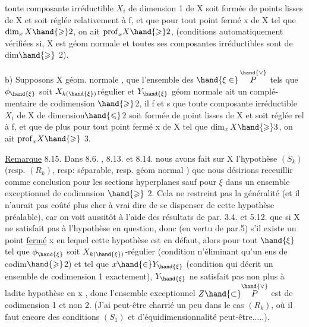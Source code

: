 

toute composante irréductible $X_i$ de dimension 1  de X soit 
formée de points lisses de X et soit  réglée relativement à f, et que
pour tout point fermé  x de X tel que $\dim_x X \hand{\geqslant} 2$, on ait $\mathrm{prof}_x X \hand{\geqslant} 2$,
(conditions automatiquement vérifiées si, X est géom normale et toutes ses
composantes irréductibles sont de dim$\hand{\geqslant}$ 2).

b) Supposons X géom. normale ,  que l'ensemble  des $\hand{\xi \in}\, \overset{\hand{\vee}}{P}$
tels que $\phi_{\hand{\xi}}$ soit $X_{k(\hand{\xi})}$\hand{-}régulier et $Y_{\hand{\xi}}$  géom normale ait un complé-%
mentaire de codimension $\hand{\geqslant}$2, il f et s que  toute composante
irréductible $X_i$ de X de dimension$\hand{\leqslant}$2 soit formée de point lisses de
X et soit réglée rel à f, et que de plus pour tout point fermé x de X
tel que $\dim_x X \hand{\geqslant} 3$, on ait $\mathrm{prof}_x X \hand{\geqslant}$ 3.





\uline{Remarque} 8.15. Dans 8.6. , 8.13. et 8.14. nous avons fait sur X
l'hypothèse $(S_k)$ (resp. $(R_k)$, resp: séparable, resp. géom normal ) que
nous désirions receuillir comme conclusion pour les sections hyperplanes
sauf pour $\xi$ dans un ensemble exceptionnel de codimnsion $\hand{\geqslant}$ 2. Cela ne restreint
pas la généralité (et il n'aurait pas coûté plus cher à vrai dire
de se dispenser de cette hypothèse préalable), car on voit aussitôt
à l'aide des résultats de par. 3.4. et 5.12. que si X ne satisfait pas à
l'hypothèse en question, donc (en vertu de par.5) s'il existe un point
\uline{fermé} x en lequel cette hypothèse est en défaut, alors pour tout $\hand{\xi}$ tel
que $\phi_{\hand{\xi}}$ soit $X_{k(\hand{\xi})}$-régulier (condition n'éliminant qu'un ens de codim$\hand{\geqslant}$2)
et tel que $x \hand{\in} Y_{\hand{\xi}}$ (condition qui décrit un ensemble de codimension 1
exactement), $Y_{\hand{\xi}}$ ne satisfait pas non plus à ladite hypothèse en x ,
donc l'ensemble exceptionnel $Z \hand{\subset} \overset{\hand{\vee}}{P}$ est de codimension 1 et non 2.
(J'ai peut-être charrié un peu dans le cas $(R_k)$, où il faut encore
des conditions $(S_1)$ et d'équidimensionnalité peut-être.....).

